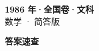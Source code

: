 \documentclass[zihao=-4, a4paper]{ctexart}
\begin{document}
\begin{center}
  {\Large\bfseries 1986 年·全国卷·文科}\\[4pt]
  {\large 数学 · 简答版}
\end{center}
\medskip
{}

\clearpage
{}
\begin{center}{\Large\bfseries 答案速查}\end{center}
\medskip

\end{document}
